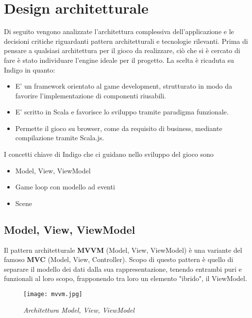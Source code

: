 \section{Design architetturale}

Di seguito vengono analizzate l'architettura complessiva dell'applicazione e le decisioni critiche riguardanti pattern architetturali e tecnologie rilevanti.
Prima di pensare a qualsiasi architettura per il gioco da realizzare, ciò che si è cercato di fare è stato individuare l'engine ideale per il progetto. 
La scelta è ricaduta su Indigo in quanto: 
\begin{itemize}
    \item E' un framework orientato al game development, strutturato in modo da favorire l'implementazione di componenti riusabili. 
    \item E' scritto in Scala e favorisce lo sviluppo tramite paradigma funzionale.
    \item Permette il gioco su browser, come da requisito di business, mediante compilazione tramite Scala.js.
\end{itemize}
I concetti chiave di Indigo che ci guidano nello sviluppo del gioco sono 
\begin{itemize}
    \item Model, View, ViewModel
    \item Game loop con modello ad eventi
    \item Scene
\end{itemize}

\subsection{Model, View, ViewModel}
Il pattern architetturale \textbf{MVVM} (Model, View, ViewModel) è una variante del famoso \textbf{MVC} (Model, View, Controller). 
Scopo di questo pattern è quello di separare il modello dei dati dalla sua rappresentazione, tenendo entrambi puri e funzionali al loro scopo, frapponendo tra loro un elemento "ibrido", il ViewModel.


\begin{figure}[!hbt]
    \centering
    \texttt{[image: mvvm.jpg]}
    \caption{\textit{Architettura Model, View, ViewModel}} 
\end{figure}

